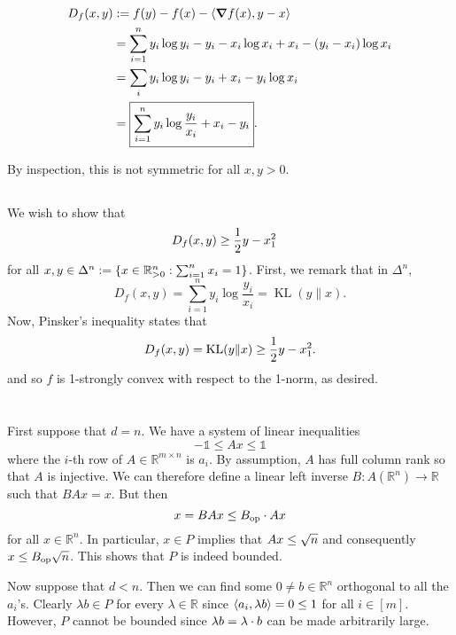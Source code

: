 \documentclass[10pt]{article}
\DeclarePairedDelimiter{\set}{\lbrace}{\rbrace}
\DeclarePairedDelimiter{\iprod}{\langle}{\rangle}
\let\abs\relax
\DeclarePairedDelimiter{\abs}{\lvert}{\rvert}
\let\norm\relax
\DeclarePairedDelimiter{\norm}{\lVert}{\rVert}
\DeclareMathOperator{\KL}{KL}
\DeclareMathOperator{\Op}{op}
\newcommand{\ones}{\mathds{1}}
\newcommand{\R}{\mathbb{R}}
\begin{document}
\subsection{}
\begin{align*}
  D_f(x, y)
  &:= f(y) - f(x) - \iprod{\grad f(x), y-x} \\
&= \sum_{i=1}^n y_i\log y_i- y_i - x_i\log x_i + x_i - (y_i-x_i)\log x_i \\
  &= \sum_i y_i\log y_i- y_i + x_i - y_i \log x_i \\
  &= \boxed{\sum_{i=1}^n y_i \log \frac{y_i}{x_i} + x_i - y_i}.
\end{align*}

By inspection,
this is not symmetric for all $x, y > 0$.

\subsection{}
We wish to show that
\begin{align*}
  D_f(x, y) &\geq \frac12 \norm{y-x}_1^2
\end{align*}
for all $x, y\in \Delta^n := \set{x\in \R_{>0}^n: \sum_{i=1}^n x_i = 1}$.
First,
we remark that in $\Delta^n$,
\[
  D_f(x, y) = \sum_{i=1}^n y_i \log \frac{y_i}{x_i}
  = \KL(y\| x).
\]
Now,
Pinsker's inequality states that
\[
  D_f(x, y) = \KL(y\| x)\geq \frac12 \norm{y-x}_1^2.
\]
and so $f$ is 1-strongly convex with respect to the 1-norm,
as desired.

\clearpage
\section{}
\subsection{}
First suppose that $d=n$.
We have a system of linear inequalities
\[
  -\ones\leq Ax\leq \ones
\]
where the $i$-th row of $A\in \R^{m\times n}$ is $a_i$.
By assumption,
$A$ has full column rank so that $A$ is injective.
We can therefore define a linear left inverse $B: A(\R^n)\to \R$ such that $BAx = x$.
But then
\[
  \norm{x} = \norm{BAx}\leq \norm{B}_{\Op}\cdot \norm{Ax}
\]
for all $x\in \R^n$.
In particular,
$x\in P$ implies that $\norm{Ax}\leq \sqrt{n}$
and consequently $\norm{x}\leq \norm{B}_{\Op}\sqrt n$.
This shows that $P$ is indeed bounded.

Now suppose that $d < n$.
Then we can find some $0\neq b\in \R^n$ orthogonal to all the $a_i$'s.
Clearly $\lambda b\in P$ for every $\lambda\in \R$
since $\iprod{a_i, \lambda b} = 0\leq 1$ for all $i\in [m]$.
However,
$P$ cannot be bounded since $\norm{\lambda b} = \abs{\lambda}\cdot \norm{b}$
can be made arbitrarily large.
\end{document}
